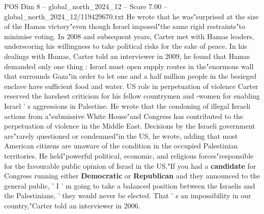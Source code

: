 \begin{textsample}{POS Dim 8 – global\_north\_2024\_12 – Score 7.00 – global\_north\_2024\_12/119429670.txt}
He wrote that he was"surprised at the size of the Hamas victory"even though Israel imposed"the same rigid restraints"to minimise voting.
In 2008 and subsequent years, Carter met with Hamas leaders, underscoring his willingness to take political risks for the sake of peace.
In his dealings with Hamas, Carter told an interviewer in 2009, he found that Hamas demanded only one thing : Israel must open supply routes in the"enormous wall that surrounds Gaza"in order to let one and a half million people in the besieged enclave have sufficient food and water.
US role in perpetuation of violence Carter reserved the harshest criticism for his fellow countrymen and -women for enabling Israel ' s aggressions in Palestine.
He wrote that the condoning of illegal Israeli actions from a"submissive White House"and Congress has contributed to the perpetuation of violence in the Middle East.
Decisions by the Israeli government are"rarely questioned or condemned"in the US, he wrote, adding that most American citizens are unaware of the condition in the occupied Palestinian territories.
He held"powerful political, economic, and religious forces"responsible for the favourable public opinion of Israel in the US."If you had a \textbf{candidate} for Congress running either \textbf{Democratic} or \textbf{Republican} and they announced to the general public, ' I ' m going to take a balanced position between the Israelis and the Palestinians, ' they would never be elected.
That ' s an impossibility in our country,"Carter told an interviewer in 2006.

\end{textsample}
